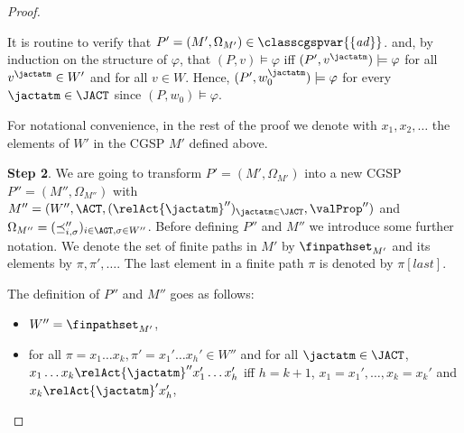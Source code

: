 \begin{proof}
\begin{itemize}
\end{itemize}

  It is routine to verify that $P'=(M',\Omega_{M'})
\in \classcgspvar{\{  \mathit{ad}  \}} $. 
and, by induction on the structure of $\varphi$,
that
$(P,v )  \models \varphi$
iff
$(P',v^\jactatm  )  \models \varphi$
for all $v^\jactatm \in W' $
and for all $v \in W $. 
Hence, $(P', w_0^{\jactatm} ) \models \varphi$
for every $\jactatm \in \JACT $
since 
$(P, w_0 ) \models \varphi$. 

  For notational convenience,
  in the rest of the proof 
  we 
 denote with 
 $x_1, x_2, \ldots $
 the
  elements
  of $W'$
in the CGSP $M'$
defined above. 


\textbf{Step 2}. 
We are going to transform 
  $P'=(M',\Omega_{M'})$ into a new CGSP 
    $P''=(M'',\Omega_{M''})$
    with 
     $M'' = ( W'',  \ACT,  (\relAct{\jactatm}''   )_{\jactatm \in \JACT}, 
  \valProp''   )$
  and $\Omega_{M''}=(\preceq_{i,\sigma  }''   )_{i \in \AGT, \sigma  \in W'' }$. 
  Before defining $P''$
  and $M''$
  we introduce some further notation.
We denote the set of finite paths
in $M'$
by  $ \finpathset_{M'}$
and its elements by $\pi, \pi', \ldots$.
The last element in a finite path $\pi$
is denoted by $\pi[\mathit{last}]$.
  
  The definition of
  $P''$
  and $M''$
  goes as follows:
     \begin{itemize}
\item $W'' = \finpathset_{M'}$, 



\item for all $\pi= x_1\ldots x_k ,
\pi' = x_1'\ldots x_h'
\in W''$
and for all $\jactatm \in \JACT$,\\
$x_1\ldots x_k
\relAct{\jactatm}''  x_1'\ldots x_h'$
iff $h=k+1$,
$x_1=x_1', \ldots, x_k=x_k'$
and $x_k \relAct{\jactatm}' x_h' $, 







\end{itemize}
\end{proof}

